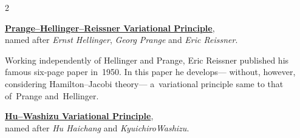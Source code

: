 

\label{para:mixedvariationalprinciples}

\begin{changemargin}{2\parindent}{\parindent}
\bgroup %
\setlength{\parindent}{\negparindent}
\small

\hspace{\parindent}\href{https://en.wikiversity.org/wiki/Introduction_to_Elasticity/Hellinger-Reissner_principle}{\textbf{Prange\hbox{--}Hellinger\hbox{--}Reissner Variational Principle}},\\
named after \emph{Ernst Hellinger}, \emph{Georg Prange} and \emph{Eric Reissner}.
\par

\nopagebreak\vspace{.16em}
{\scriptsize \noindent Working independently of Hellinger and Prange, Eric Reissner published his famous six\hbox{-}page paper  in~1950. In this paper he develops\:--- without, however, considering Hamilton\hbox{--}Jacobi theory\:--- a~variational principle same to that of~Prange and~Hellinger.\par}

\nopagebreak\vspace{.32em}
\href{https://en.wikiversity.org/wiki/Introduction_to_Elasticity/Hu-Washizu_principle}{\textbf{Hu\hbox{--}Washizu Variational Principle}},\\
named after \emph{Hu Haichang} and \emph{Kyuichiro\;Washizu}.
\par
\egroup
\nopagebreak\vspace{.1em}
\end{changemargin}

